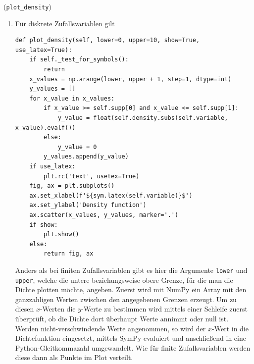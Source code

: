 \begin{Code}{(\lstinline|plot_density|)}
\begin{enumerate}[label=(\roman*)]
\item Für diskrete Zufallsvariablen gilt
\begin{lstlisting}
def plot_density(self, lower=0, upper=10, show=True, use_latex=True):
    if self._test_for_symbols():
        return
    x_values = np.arange(lower, upper + 1, step=1, dtype=int)
    y_values = []
    for x_value in x_values:
        if x_value >= self.supp[0] and x_value <= self.supp[1]:
            y_value = float(self.density.subs(self.variable, x_value).evalf())
        else:
            y_value = 0
        y_values.append(y_value)
    if use_latex:
        plt.rc('text', usetex=True)
    fig, ax = plt.subplots()
    ax.set_xlabel(f'${sym.latex(self.variable)}$')
    ax.set_ylabel('Density function')
    ax.scatter(x_values, y_values, marker='.')
    if show:
        plt.show()
    else:
        return fig, ax
\end{lstlisting}
Anders als bei finiten Zufallsvariablen gibt es hier die Argumente \lstinline|lower| und \lstinline|upper|, welche die untere beziehungsweise obere Grenze, für die man die Dichte plotten möchte, angeben. Zuerst wird mit NumPy ein Array mit den ganzzahligen Werten zwischen den angegebenen Grenzen erzeugt. Um zu diesen $x$-Werten die $y$-Werte zu bestimmen wird mittels einer Schleife zuerst überprüft, ob die Dichte dort überhaupt Werte annimmt oder null ist. Werden nicht-verschwindende Werte angenommen, so wird der $x$-Wert in die Dichtefunktion eingesetzt, mittels SymPy evaluiert und anschließend in eine Python-Gleitkommazahl umgewandelt. Wie für finite Zufallsvariablen werden diese dann als Punkte im Plot verteilt.


\end{enumerate}
\end{Code}
